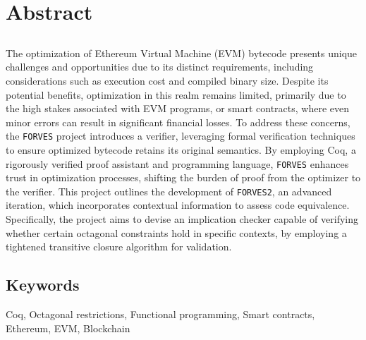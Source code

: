 \chapter*{Abstract}

\section*{\tituloPortadaEngVal}

The optimization of Ethereum Virtual Machine (EVM) bytecode presents unique challenges and opportunities due to its 
distinct requirements, including considerations such as execution cost and compiled binary size. Despite its potential 
benefits, optimization in this realm remains limited, primarily due to the high stakes associated with EVM programs, or 
smart contracts, where even minor errors can result in significant financial losses. To address these concerns, the 
\verb|FORVES| project introduces a verifier, leveraging formal verification techniques to ensure optimized bytecode retains 
its original semantics. By employing Coq, a rigorously verified proof assistant and programming language, \verb|FORVES| 
enhances trust in optimization processes, shifting the burden of proof from the optimizer to the verifier. This project 
outlines the development of \verb|FORVES2|, an advanced iteration, which incorporates contextual information to assess code 
equivalence. Specifically, the project aims to devise an implication checker capable of verifying whether certain 
octagonal constraints hold in specific contexts, by employing a tightened transitive closure algorithm for validation.

\section*{Keywords}

\noindent Coq, Octagonal restrictions, Functional programming, Smart contracts, Ethereum, EVM, Blockchain



